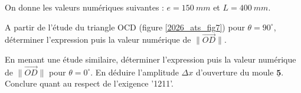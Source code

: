 On donne les valeurs numériques suivantes : $e = \SI{150}{mm}$ et $L=\SI{400}{mm}$.


\begin{question}
A partir de l'étude du triangle OCD (figure \ref{2026_ats_fig7}) pour $\theta=90^{\circ}$, déterminer l'expression puis la valeur numérique de $\|\overrightarrow{O D}\|$.
\end{question}
\ifprof
\begin{corrige}
\end{corrige}
\else
\fi

\begin{question}
En menant une étude similaire, déterminer l'expression puis la valeur numérique de $\|\overrightarrow{O D}\|$ pour $\theta=0^{\circ}$. En déduire l'amplitude $\Delta x$ d'ouverture du moule $\underline{\mathbf{5}}$. Conclure quant au respect de l'exigence '1211'.
\end{question}
\ifprof
\begin{corrige}
\end{corrige}
\else
\fi
%
%
%
